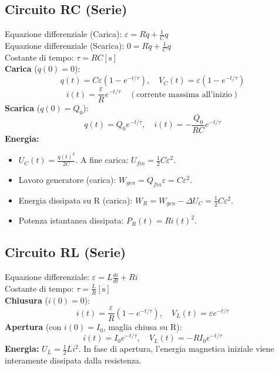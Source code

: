 \documentclass{book}
\begin{document}
\subsection*{Circuito RC (Serie)}
Equazione differenziale (Carica): $\varepsilon = R \dot{q} + \frac{1}{C}q$\\
Equazione differenziale (Scarica): $0 = R \dot{q} + \frac{1}{C}q$ \\[1ex]
Costante di tempo: $\tau = RC \left[ \mathrm{s} \right]$ \\
\textbf{Carica} ($q(0)=0$):
\[ q(t) = C\varepsilon \left( 1 - e^{-t/\tau} \right), \quad V_C(t) = \varepsilon(1 - e^{-t/\tau}) \]
\[ i(t) = \frac{\varepsilon}{R} e^{-t/\tau} \quad (\text{corrente massima all'inizio}) \]
\textbf{Scarica} ($q(0)=Q_0$):
\[ q(t) = Q_0 e^{-t/\tau}, \quad i(t) = -\frac{Q_0}{RC} e^{-t/\tau} \]
\textbf{Energia:}
\begin{itemize}[noitemsep]
    \item $U_C(t) = \frac{q(t)^2}{2C}$. A fine carica: $U_{fin} = \frac{1}{2}C\varepsilon^2$.
    \item Lavoro generatore (carica): $W_{gen} = Q_{fin}\varepsilon = C\varepsilon^2$.
    \item Energia dissipata su R (carica): $W_R = W_{gen} - \Delta U_C = \frac{1}{2}C\varepsilon^2$.
    \item Potenza istantanea dissipata: $P_R(t) = R i(t)^2$.
\end{itemize}

\subsection*{Circuito RL (Serie)}
Equazione differenziale: $\varepsilon = L \frac{di}{dt} + Ri$ \\
Costante di tempo: $\tau = \frac{L}{R} \left[ \mathrm{s} \right]$ \\
\textbf{Chiusura} ($i(0)=0$):
\[ i(t) = \frac{\varepsilon}{R} \left( 1 - e^{-t/\tau} \right), \quad V_L(t) = \varepsilon e^{-t/\tau} \]
\textbf{Apertura} (con $i(0)=I_0$, maglia chiusa su R):
\[ i(t) = I_0 e^{-t/\tau}, \quad V_L(t) = -R I_0 e^{-t/\tau} \]
\textbf{Energia:}
$U_L = \frac{1}{2}Li^2$. In fase di apertura, l'energia magnetica iniziale viene interamente dissipata dalla resistenza.
\end{document}
